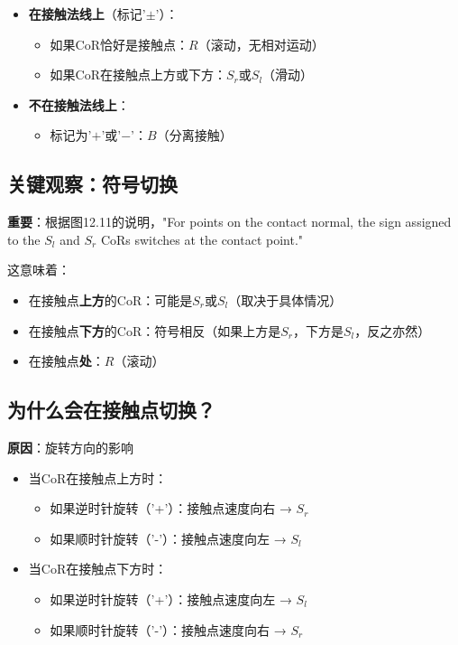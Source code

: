 \documentclass[12pt,a4paper]{article}
\begin{document}
\begin{itemize}
\item \textbf{在接触法线上}（标记'$\pm$'）：
  \begin{itemize}
  \item 如果CoR恰好是接触点：$R$（滚动，无相对运动）
  \item 如果CoR在接触点上方或下方：$S_r$或$S_l$（滑动）
  \end{itemize}

\item \textbf{不在接触法线上}：
  \begin{itemize}
  \item 标记为'$+$'或'$-$'：$B$（分离接触）
  \end{itemize}
\end{itemize}

\subsection{关键观察：符号切换}

\textbf{重要}：根据图12.11的说明，"For points on the contact normal, the sign assigned to the $S_l$ and $S_r$ CoRs switches at the contact point."

这意味着：
\begin{itemize}
\item 在接触点\textbf{上方}的CoR：可能是$S_r$或$S_l$（取决于具体情况）
\item 在接触点\textbf{下方}的CoR：符号相反（如果上方是$S_r$，下方是$S_l$，反之亦然）
\item 在接触点\textbf{处}：$R$（滚动）
\end{itemize}

\subsection{为什么会在接触点切换？}

\textbf{原因}：旋转方向的影响

\begin{itemize}
\item 当CoR在接触点上方时：
  \begin{itemize}
  \item 如果逆时针旋转（'+'）：接触点速度向右 → $S_r$
  \item 如果顺时针旋转（'-'）：接触点速度向左 → $S_l$
  \end{itemize}

\item 当CoR在接触点下方时：
  \begin{itemize}
  \item 如果逆时针旋转（'+'）：接触点速度向左 → $S_l$
  \item 如果顺时针旋转（'-'）：接触点速度向右 → $S_r$
  \end{itemize}
\end{itemize}
\end{document}
